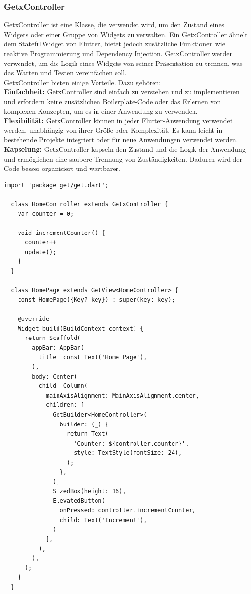 \subsubsection{GetxController}
GetxController ist eine Klasse, die verwendet wird, um den Zustand eines Widgets oder einer Gruppe von Widgets zu verwalten. Ein GetxController ähnelt dem StatefulWidget von Flutter, bietet jedoch zusätzliche Funktionen wie reaktive Programmierung und Dependency Injection. GetxController werden verwendet, um die Logik eines Widgets von seiner Präsentation zu trennen, was das Warten und Testen vereinfachen soll.
\\
GetxController bieten einige Vorteile. Dazu gehören:
\\
\textbf{Einfachheit:}
GetxController sind einfach zu verstehen und zu implementieren und erfordern keine zusätzlichen Boilerplate-Code oder das Erlernen von komplexen Konzepten, um es in einer Anwendung zu verwenden.
\\
\textbf{Flexibilität:}
GetxController können in jeder Flutter-Anwendung verwendet werden, unabhängig von ihrer Größe oder Komplexität. Es kann leicht in bestehende Projekte integriert oder für neue Anwendungen verwendet werden.
\\
\textbf{Kapselung:}
GetxController kapseln den Zustand und die Logik der Anwendung und ermöglichen eine saubere Trennung von Zuständigkeiten. Dadurch wird der Code besser organisiert und wartbarer.
\\
\begin{lstlisting}[caption=Beispiel zum Einsatz von einem GetxController in Kombination mit GetView,label=lst:GetxControllerExample]
  import 'package:get/get.dart';

  class HomeController extends GetxController {
    var counter = 0;

    void incrementCounter() {
      counter++;
      update();
    }
  }

  class HomePage extends GetView<HomeController> {
    const HomePage({Key? key}) : super(key: key);

    @override
    Widget build(BuildContext context) {
      return Scaffold(
        appBar: AppBar(
          title: const Text('Home Page'),
        ),
        body: Center(
          child: Column(
            mainAxisAlignment: MainAxisAlignment.center,
            children: [
              GetBuilder<HomeController>(
                builder: (_) {
                  return Text(
                    'Counter: ${controller.counter}',
                    style: TextStyle(fontSize: 24),
                  );
                },
              ),
              SizedBox(height: 16),
              ElevatedButton(
                onPressed: controller.incrementCounter,
                child: Text('Increment'),
              ),
            ],
          ),
        ),
      );
    }
  }
\end{lstlisting}
